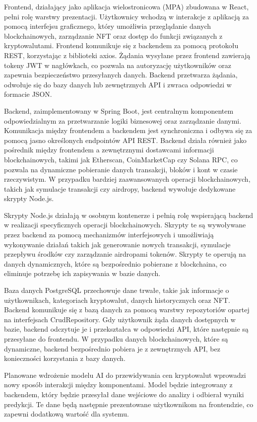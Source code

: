 Frontend, działający jako aplikacja wielostronicowa (MPA) zbudowana w React, pełni rolę warstwy prezentacji. Użytkownicy wchodzą w interakcje z aplikacją za pomocą interfejsu graficznego, który umożliwia przeglądanie danych blockchainowych, zarządzanie NFT oraz dostęp do funkcji związanych z kryptowalutami. Frontend komunikuje się z backendem za pomocą protokołu REST, korzystając z biblioteki axios. Żądania wysyłane przez frontend zawierają tokeny JWT w nagłówkach, co pozwala na autoryzację użytkowników oraz zapewnia bezpieczeństwo przesyłanych danych. Backend przetwarza żądania, odwołuje się do bazy danych lub zewnętrznych API i zwraca odpowiedzi w formacie JSON.

Backend, zaimplementowany w Spring Boot, jest centralnym komponentem odpowiedzialnym za przetwarzanie logiki biznesowej oraz zarządzanie danymi. Komunikacja między frontendem a backendem jest synchroniczna i odbywa się za pomocą jasno określonych endpointów API REST. Backend działa również jako pośrednik między frontendem a zewnętrznymi dostawcami informacji blockchainowych, takimi jak Etherscan, CoinMarketCap czy Solana RPC, co pozwala na dynamiczne pobieranie danych transakcji, bloków i kont w czasie rzeczywistym. W przypadku bardziej zaawansowanych operacji blockchainowych, takich jak symulacje transakcji czy airdropy, backend wywołuje dedykowane skrypty Node.js.

Skrypty Node.js działają w osobnym kontenerze i pełnią rolę wspierającą backend w realizacji specyficznych operacji blockchainowych. Skrypty te są wywoływane przez backend za pomocą mechanizmów interfejsowych i umożliwiają wykonywanie działań takich jak generowanie nowych transakcji, symulacje przepływu środków czy zarządzanie airdropami tokenów. Skrypty te operują na danych dynamicznych, które są bezpośrednio pobierane z blockchaina, co eliminuje potrzebę ich zapisywania w bazie danych.

Baza danych PostgreSQL przechowuje dane trwałe, takie jak informacje o użytkownikach, kategoriach kryptowalut, danych historycznych oraz NFT. Backend komunikuje się z bazą danych za pomocą warstwy repozytoriów opartej na interfejsach CrudRepository. Gdy użytkownik żąda danych dostępnych w bazie, backend odczytuje je i przekształca w odpowiedzi API, które następnie są przesyłane do frontendu. W przypadku danych blockchainowych, które są dynamiczne, backend bezpośrednio pobiera je z zewnętrznych API, bez konieczności korzystania z bazy danych.

Planowane wdrożenie modelu AI do przewidywania cen kryptowalut wprowadzi nowy sposób interakcji między komponentami. Model będzie integrowany z backendem, który będzie przesyłał dane wejściowe do analizy i odbierał wyniki predykcji. Te dane będą następnie prezentowane użytkownikom na frontendzie, co zapewni dodatkową wartość dla systemu.

